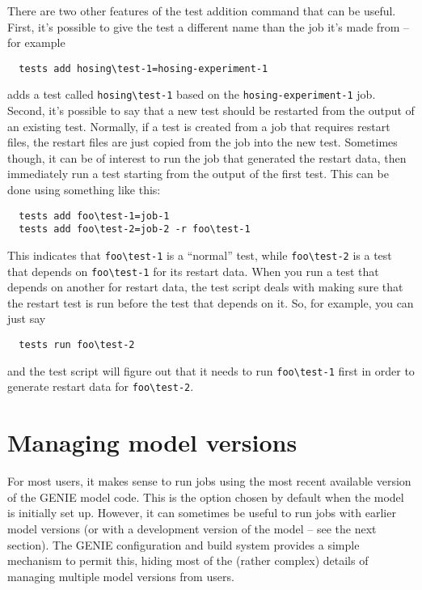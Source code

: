 \documentclass[a4paper,10pt,article]{memoir}
\begin{document}
There are two other features of the test addition command that can be
useful.  First, it's possible to give the test a different name than
the job it's made from -- for example
\begin{verbatim}
  tests add hosing\test-1=hosing-experiment-1
\end{verbatim}
adds a test called \texttt{hosing\textbackslash{}test-1} based on the
\texttt{hosing-experiment-1} job.  Second, it's possible to say that a
new test should be restarted from the output of an existing test.
Normally, if a test is created from a job that requires restart files,
the restart files are just copied from the job into the new test.
Sometimes though, it can be of interest to run the job that generated
the restart data, then immediately run a test starting from the output
of the first test.  This can be done using something like this:
\begin{verbatim}
  tests add foo\test-1=job-1
  tests add foo\test-2=job-2 -r foo\test-1
\end{verbatim}
This indicates that \texttt{foo\textbackslash{}test-1} is a ``normal''
test, while \texttt{foo\textbackslash{}test-2} is a test that depends
on \texttt{foo\textbackslash{}test-1} for its restart data.  When you
run a test that depends on another for restart data, the test script
deals with making sure that the restart test is run before the test
that depends on it.  So, for example, you can just say
\begin{verbatim}
  tests run foo\test-2
\end{verbatim}
and the test script will figure out that it needs to run
\texttt{foo\textbackslash{}test-1} first in order to generate restart
data for \texttt{foo\textbackslash{}test-2}.

\section{Managing model versions}

For most users, it makes sense to run jobs using the most recent
available version of the GENIE model code.  This is the option chosen
by default when the model is initially set up.  However, it can
sometimes be useful to run jobs with earlier model versions (or with a
development version of the model -- see the next section).  The GENIE
configuration and build system provides a simple mechanism to permit
this, hiding most of the (rather complex) details of managing multiple
model versions from users.
\end{document}
